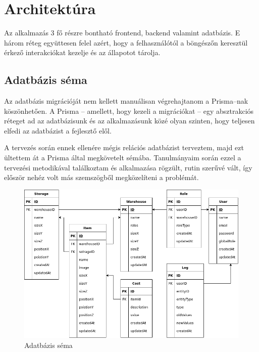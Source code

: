 \chapter{Architektúra}
Az alkalmazás 3 fő részre bontható frontend, backend valamint adatbázis.
E három réteg együttesen felel azért, hogy a felhasználótól a böngészőn keresztül érkező interakciókat kezelje és az állapotot tárolja.

\section{Adatbázis séma}
Az adatbázis migrációját nem kellett manuálisan végrehajtanom a Prisma–nak köszönhetően. 
A Prisma – amellett, hogy kezeli a migrációkat – egy absztrakciós réteget ad az adatbázisunk és az alkalmazásunk közé olyan szinten, hogy teljesen elfedi az adatbázist a fejlesztő elől.

A tervezés során ennek ellenére mégis relációs adatbázist terveztem, majd ezt ültettem át a Prisma által megkövetelt sémába.
Tanulmányaim során ezzel a tervezési metodikával találkoztam és alkalmazása rögzült, rutin szerűvé vált, így először nehéz volt más szemszögből megközelíteni a problémát.

\begin{figure}[!ht]
  \centering
  \includegraphics[width=150mm, keepaspectratio]{figures/db.png}
  \caption{Adatbázis séma}
  \label{fig:db}
\end{figure}

